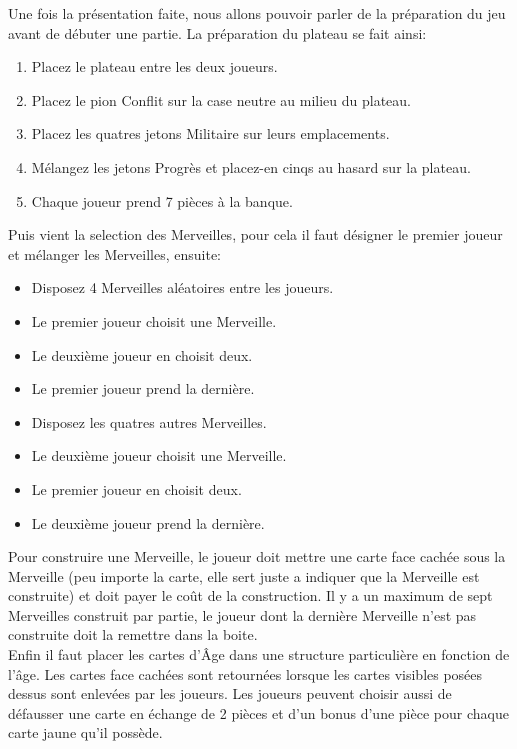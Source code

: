 \documentclass[12pt]{article}
\begin{document}
    	Une fois la présentation faite, nous allons pouvoir parler de la préparation du jeu avant de débuter une partie.
    	La préparation du plateau se fait ainsi:
    	\begin{enumerate}
    		\item Placez le plateau entre les deux joueurs.
    		\item Placez le pion Conflit sur la case neutre au milieu du plateau.
    		\item Placez les quatres jetons Militaire sur leurs emplacements.
    		\item Mélangez les jetons Progrès et placez-en cinqs au hasard sur la plateau.
    		\item Chaque joueur prend 7 pièces à la banque.
    	\end{enumerate}
    
    	Puis vient la selection des Merveilles, pour cela il faut désigner le premier joueur et mélanger les Merveilles,
    	ensuite:
    	\begin{itemize}
    		\item Disposez 4 Merveilles aléatoires entre les joueurs.
    		\item Le premier joueur choisit une Merveille.
    		\item Le deuxième joueur en choisit deux.
    		\item Le premier joueur prend la dernière.
    		\item Disposez les quatres autres Merveilles.
    		\item Le deuxième joueur choisit une Merveille.
    		\item Le premier joueur en choisit deux.
    		\item Le deuxième joueur prend la dernière.
    	\end{itemize}
    	Pour construire une Merveille, le joueur doit mettre une carte face cachée sous la Merveille (peu importe la carte, elle sert juste a indiquer que la Merveille est construite) et doit payer le coût de la construction. Il y a un maximum de sept Merveilles construit par partie, le joueur dont la dernière Merveille n'est pas construite doit la remettre dans la boite.\\
    	Enfin il faut placer les cartes d'Âge dans une structure particulière en fonction de l'âge. Les cartes face cachées sont retournées lorsque les cartes visibles posées dessus sont enlevées par les joueurs. Les joueurs peuvent choisir aussi de défausser une carte en échange de 2 pièces et d'un bonus d'une pièce pour chaque carte jaune qu'il possède.
    
\end{document}
